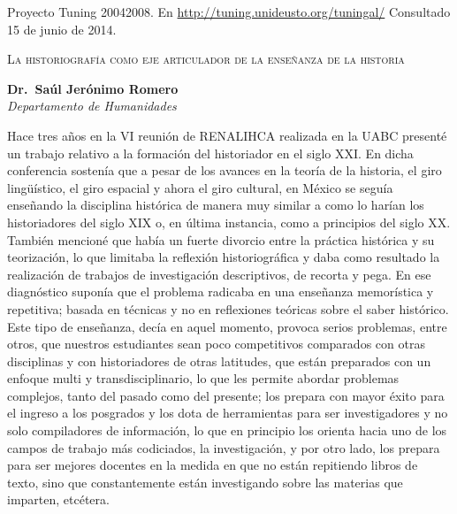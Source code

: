 \begin{sloppypar}
Proyecto Tuning 2004\textendash{}2008. En \url{http://tuning.unideusto.org/tuningal/}
Consultado 15 de junio de 2014.
\end{sloppypar}%

\thispagestyle{empty}
{\centering \large {\scshape La historiografía como eje articulador de la 
enseñanza de la historia }}
\par
{}
\setcounter{footnote}{0}

\bigskip
\begin{center}
{\bfseries Dr.\ Saúl Jerónimo Romero}\\
{\itshape Departamento de Humanidades}
\end{center}

\bigskip
Hace tres años en la VI reunión de RENALIHCA realizada en la UABC 
presenté un trabajo relativo a la formación del historiador en el siglo 
XXI. En dicha conferencia sostenía que a pesar de los avances en la 
teoría de la historia, el giro lingüístico, el giro espacial y ahora el 
giro cultural, en México se seguía enseñando la disciplina histórica de 
manera muy similar a como lo harían los historiadores del siglo XIX o, en 
última instancia, como a principios del siglo XX. También mencioné que 
había un fuerte divorcio entre la práctica histórica y su teorización, 
lo que limitaba la reflexión historiográfica y daba como resultado la 
realización de trabajos de investigación descriptivos, de recorta y 
pega. En ese diagnóstico suponía que el problema radicaba en una 
enseñanza memorística y repetitiva; basada en técnicas y no en 
reflexiones teóricas sobre el saber histórico. Este tipo de enseñanza, 
decía en aquel momento, provoca serios problemas, entre otros, que 
nuestros estudiantes sean poco competitivos comparados con otras 
disciplinas y con historiadores de otras latitudes, que están 
preparados con un enfoque multi y transdisciplinario, lo que les 
permite abordar problemas complejos, tanto del pasado como del 
presente; los prepara con mayor éxito para el ingreso a los posgrados y 
los dota de herramientas para ser investigadores y no solo 
compiladores de información, lo que en principio los orienta hacia uno 
de los campos de trabajo más codiciados, la investigación, y por otro 
lado, los prepara para ser mejores docentes en la medida en que no 
están repitiendo libros de texto, sino que constantemente están 
investigando sobre las materias que imparten, etcétera.

